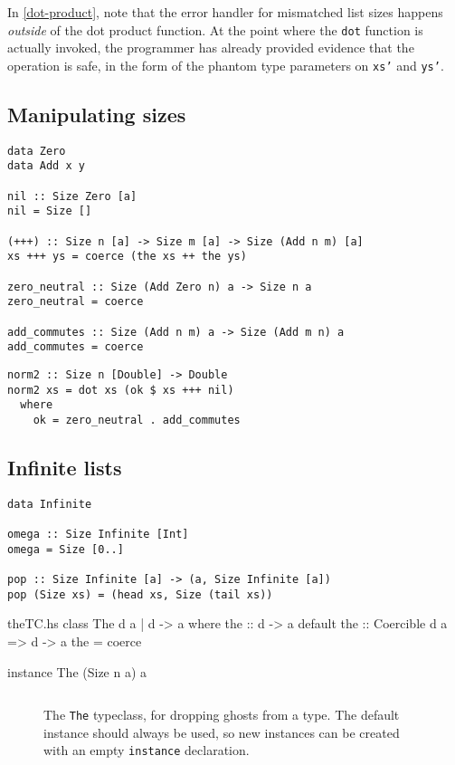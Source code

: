 \documentclass[format=sigplan, review=false, screen=true]{acmart}
\begin{document}
In \cref{dot-product}, note that the error handler for mismatched list sizes happens
\emph{outside} of the dot product function. At the point where the \texttt{dot} function
is actually invoked, the programmer has already provided evidence that the operation is
safe, in the form of the phantom type parameters on \texttt{xs'} and \texttt{ys'}.

\subsection{Manipulating sizes}

\begin{verbatim}
data Zero
data Add x y

nil :: Size Zero [a]
nil = Size []

(+++) :: Size n [a] -> Size m [a] -> Size (Add n m) [a]
xs +++ ys = coerce (the xs ++ the ys)

zero_neutral :: Size (Add Zero n) a -> Size n a
zero_neutral = coerce

add_commutes :: Size (Add n m) a -> Size (Add m n) a
add_commutes = coerce
\end{verbatim}


\begin{verbatim}
norm2 :: Size n [Double] -> Double
norm2 xs = dot xs (ok $ xs +++ nil)
  where
    ok = zero_neutral . add_commutes
\end{verbatim}

\subsection{Infinite lists}

\begin{verbatim}
data Infinite

omega :: Size Infinite [Int]
omega = Size [0..]

pop :: Size Infinite [a] -> (a, Size Infinite [a])
pop (Size xs) = (head xs, Size (tail xs))
\end{verbatim}

\begin{filecontents*}{theTC.hs}
class The d a | d -> a where
    the :: d -> a
    default the :: Coercible d a => d -> a
    the = coerce
    
instance The (Size n a) a
\end{filecontents*}

\begin{figure}
  \inputminted{haskell}{theTC.hs}
  \caption{The \texttt{The} typeclass, for dropping ghosts
    from a type. The default instance should always be used,
    so new instances can be created with an empty
    \texttt{instance} declaration.}
\end{figure}
\end{document}
